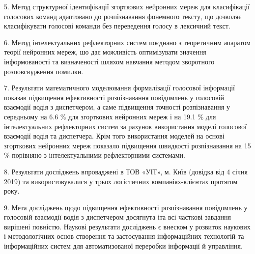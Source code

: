 


5. Метод структурної ідентифікації згорткових нейронних мереж для класифікації голосових команд адаптовано до розпізнавання фонемного тексту, що дозволяє класифікувати голосові команди без переведення голосу в лексичний текст. 

6. Метод інтелектуальних рефлекторних систем поєднано з теоретичним апаратом теорії нейронних мереж, шо дає можливість оптимізувати значення інформованості та визначеності шляхом навчання методом зворотного розповсюдження помилки.

7. Результати математичного моделювання формалізації голосової інформації показав підвищення ефективності розпізнавання повідомлень у голосовій взаємодії водія з диспетчером, а саме підвищення точності розпізнавання у середньому на 6.6 \% для згорткових нейронних мереж і на 19.1 \% для інтелектуальних рефлекторних систем за рахунок використання моделі голосової взаємодії водія та диспетчера. Крім того використання моделей на основі згорткових нейронних мереж показало підвищення швидкості розпізнавання на 15 \% порівняно з інтелектуальними рефлекторними системами.

8. Результати досліджень впроваджені в ТОВ «УІТ», м. Київ (довідка від 4 січня 2019) та використовувалися у трьох логістичних компаніях-клієнтах протягом року.

9. Мета досліджень щодо підвищення ефективності розпізнавання повідомлень у голосовій взаємодії водія з диспетчером досягнута іта всі часткові завдання вирішені повністю. Наукові результати досліджень є внеском у розвиток наукових і методологічних основ створення та застосування інформаційних технологій та інформаційних систем для автоматизованої переробки інформації й управління.

